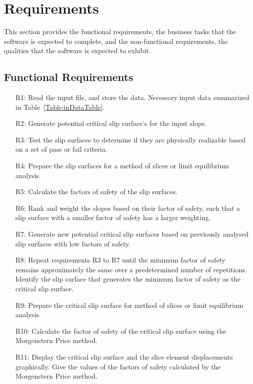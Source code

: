 \documentclass[12pt]{article}
\begin{document}
\section{Requirements}
\label{Sec:Requirements}
This section provides the functional requirements, the business tasks that the software is expected to complete, and the non-functional requirements, the qualities that the software is expected to exhibit.
\subsection{Functional Requirements}
\label{Sec:FRs}
\begin{itemize}
\item[R1:]Read the input file, and store the data. Necessary input data summarized in Table~\ref{Table:inDataTable}.
\item[R2:]Generate potential critical slip surface's for the input slope.
\item[R3:]Test the slip surfaces to determine if they are physically realizable based on a set of pass or fail criteria.
\item[R4:]Prepare the slip surfaces for a method of slices or limit equilibrium analysis.
\item[R5:]Calculate the factors of safety of the slip surfaces.
\item[R6:]Rank and weight the slopes based on their factor of safety, such that a slip surface with a smaller factor of safety has a larger weighting.
\item[R7:]Generate new potential critical slip surfaces based on previously analysed slip surfaces with low factors of safety.
\item[R8:]Repeat requirements R3 to R7 until the minimum factor of safety remains approximately the same over a predetermined number of repetitions. Identify the slip surface that generates the minimum factor of safety as the critical slip surface.
\item[R9:]Prepare the critical slip surface for method of slices or limit equilibrium analysis.
\item[R10:]Calculate the factor of safety of the critical slip surface using the Morgenstern Price method.
\item[R11:]Display the critical slip surface and the slice element displacements graphically. Give the values of the factors of safety calculated by the Morgenstern Price method.
\end{itemize}
\end{document}
